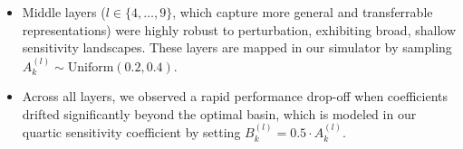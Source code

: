 \begin{enumerate}
\begin{itemize}
These layers are mapped in our simulator by sampling $A_k^{(l)} \sim \text{Uniform}(0.8, 1.2)$.
        \item Middle layers ($l \in \{4, \dots, 9\}$, which capture more general and transferrable representations) were highly robust to perturbation, exhibiting broad, shallow sensitivity landscapes.
These layers are mapped in our simulator by sampling $A_k^{(l)} \sim \text{Uniform}(0.2, 0.4)$.
        \item Across all layers, we observed a rapid performance drop-off when coefficients drifted significantly beyond the optimal basin, which is modeled in our quartic sensitivity coefficient by setting $B_k^{(l)} = 0.5 \cdot A_k^{(l)}$.
    \end{itemize}
\end{enumerate}

